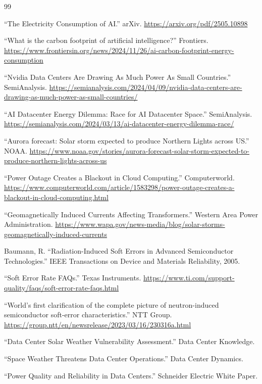 \documentclass[11pt,a4paper]{article}
\begin{document}
\begin{thebibliography}{99}

 ``The Electricity Consumption of AI.'' arXiv.
\url{https://arxiv.org/pdf/2505.10898}

 ``What is the carbon footprint of artificial intelligence?''
Frontiers. \url{https://www.frontiersin.org/news/2024/11/26/ai-carbon-footprint-energy-consumption}

 ``Nvidia Data Centers Are Drawing As Much Power As Small Countries.'' SemiAnalysis.
\url{https://semianalysis.com/2024/04/09/nvidia-data-centers-are-drawing-as-much-power-as-small-countries/}

 ``AI Datacenter Energy Dilemma: Race for AI Datacenter Space.'' SemiAnalysis.
\url{https://semianalysis.com/2024/03/13/ai-datacenter-energy-dilemma-race/}

 ``Aurora forecast: Solar storm expected to produce Northern Lights across US.'' NOAA.
\url{https://www.noaa.gov/stories/aurora-forecast-solar-storm-expected-to-produce-northern-lights-across-us}

 ``Power Outage Creates a Blackout in Cloud Computing.'' Computerworld.
\url{https://www.computerworld.com/article/1583298/power-outage-creates-a-blackout-in-cloud-computing.html}

 ``Geomagnetically Induced Currents Affecting Transformers.'' Western Area Power Administration.
\url{https://www.wapa.gov/news-media/blog/solar-storms-geomagnetically-induced-currents}

 Baumann, R. ``Radiation-Induced Soft Errors in Advanced Semiconductor Technologies.'' 
IEEE Transactions on Device and Materials Reliability, 2005.

 ``Soft Error Rate FAQs.'' Texas Instruments.
\url{https://www.ti.com/support-quality/faqs/soft-error-rate-faqs.html}

 ``World's first clarification of the complete picture of neutron-induced semiconductor soft-error characteristics.'' NTT Group.
\url{https://group.ntt/en/newsrelease/2023/03/16/230316a.html}

 ``Data Center Solar Weather Vulnerability Assessment.'' Data Center Knowledge.

 ``Space Weather Threatens Data Center Operations.'' Data Center Dynamics.

 ``Power Quality and Reliability in Data Centers.'' Schneider Electric White Paper.


\end{thebibliography}
\end{document}
